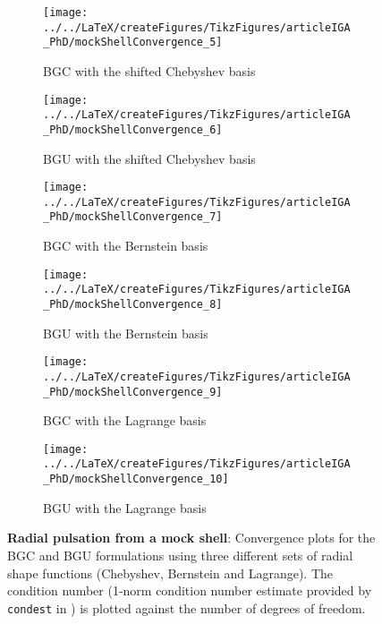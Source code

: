 \begin{figure}
	\begin{subfigure}{0.49\textwidth}
		\centering
		\texttt{[image: ../../LaTeX/createFigures/TikzFigures/articleIGA\_PhD/mockShellConvergence\_5]}
		\caption{BGC with the shifted Chebyshev basis}
	\end{subfigure}%
	\hspace*{0.02\textwidth}%
	\begin{subfigure}{0.49\textwidth}
		\centering
		\texttt{[image: ../../LaTeX/createFigures/TikzFigures/articleIGA\_PhD/mockShellConvergence\_6]}
		\caption{BGU with the shifted Chebyshev basis}
	\end{subfigure}
	\par\bigskip
	\begin{subfigure}{0.49\textwidth}
		\centering
		\texttt{[image: ../../LaTeX/createFigures/TikzFigures/articleIGA\_PhD/mockShellConvergence\_7]}
		\caption{BGC with the Bernstein basis}
	\end{subfigure}%
	\hspace*{0.02\textwidth}%
	\begin{subfigure}{0.49\textwidth}
		\centering
		\texttt{[image: ../../LaTeX/createFigures/TikzFigures/articleIGA\_PhD/mockShellConvergence\_8]}
		\caption{BGU with the Bernstein basis}
	\end{subfigure}
	\par\bigskip
	\begin{subfigure}{0.49\textwidth}
		\centering
		\texttt{[image: ../../LaTeX/createFigures/TikzFigures/articleIGA\_PhD/mockShellConvergence\_9]}
		\caption{BGC with the Lagrange basis}
	\end{subfigure}%
	\hspace*{0.02\textwidth}%
	\begin{subfigure}{0.49\textwidth}
		\centering
		\texttt{[image: ../../LaTeX/createFigures/TikzFigures/articleIGA\_PhD/mockShellConvergence\_10]}
		\caption{BGU with the Lagrange basis}
	\end{subfigure}
	\caption{\textbf{Radial pulsation from a mock shell}: Convergence plots for the BGC and BGU formulations using three different sets of radial shape functions (Chebyshev, Bernstein and Lagrange). The condition number (1-norm condition number estimate provided by \texttt{condest} in \MATLAB) is plotted against the number of degrees of freedom.}
	\label{Fig2:MS_condNumbersB}
\end{figure}


